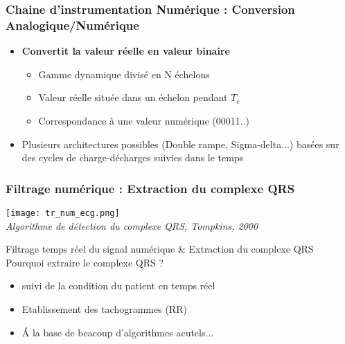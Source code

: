 \documentclass{beamer}
\begin{document}
\begin{frame}
\frametitle{Chaine d'instrumentation Numérique : Conversion Analogique/Numérique}
\begin{center}
\end{center}
\vspace{0.1cm}
\begin{itemize}
\item \textbf{Convertit la valeur réelle en valeur binaire}
\vspace{0.2cm}
\begin{itemize}
\item Gamme dynamique divisé en N échelons  
\vspace{0.2cm}
\item Valeur réelle située dans un échelon pendant $T_e$
\vspace{0.2cm}
\item Correspondance à une valeur numérique (00011..)
\end{itemize}
\vspace{0.2cm}
\item Plusieurs architectures possibles (Double rampe, Sigma-delta...) basées sur des cycles de charge-décharges suivies dans le temps
\end{itemize}
\end{frame}

\begin{frame}
\frametitle{Filtrage numérique :  Extraction du complexe QRS}
\begin{center}
\texttt{[image: tr\_num\_ecg.png]}\\
\textit{\footnotesize Algorithme de détection du complexe QRS, Tompkins, 2000}\\
\end{center}
Filtrage temps réel du signal numérique \& Extraction du complexe QRS\\
\vspace{0.3cm}
Pourquoi extraire le complexe QRS ?\\
\vspace{0.2cm}
\begin{itemize}
\item suivi de la condition du patient en temps réel 
\item Etablissement des tachogrammes (RR)
\item \'A la base de beacoup d'algorithmes acutels...
\end{itemize}

\end{frame}
\end{document}
